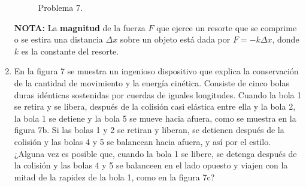 \documentclass{article}
\begin{document}
\begin{enumerate}
\begin{figure}[H]
\caption{Problema 7.}
\end{figure}

\textbf{NOTA:} La \textbf{magnitud} de la fuerza $F$ que ejerce un resorte que se comprime o se estira una distancia $\Delta x$ sobre un objeto está dada por $F=-k\Delta x$, donde $k$ es la constante del resorte. 


\item En la figura 7 se muestra un ingenioso dispositivo que explica la conservación de la cantidad de movimiento
y la energía cinética. Consiste de cinco bolas duras idénticas sostenidas por cuerdas de iguales longitudes. Cuando la bola 1 se retira y se libera, después de la colisión casi elástica entre ella y la bola 2, la bola 1 se detiene y la bola 5 se mueve hacia afuera, como se muestra en la figura 7b. Si las bolas 1 y 2 se retiran y liberan, se detienen después de la colisión y las bolas 4 y 5 se balancean hacia afuera, y así por el estilo. ¿Alguna vez es posible que, cuando la bola 1 se libere, se detenga después de la colisión y las bolas 4 y 5 se balanceen en el lado opuesto y viajen con la mitad de la rapidez de la bola 1, como en la figura 7c?


\end{enumerate}
\end{document}
